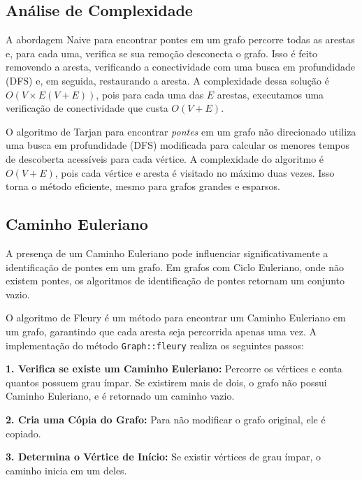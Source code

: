 \documentclass{article}
\begin{document}
\subsection{An\'alise de Complexidade}

A abordagem Naive para encontrar pontes em um grafo percorre todas as arestas e, para cada uma, verifica se sua remoção desconecta o grafo. Isso é feito removendo a aresta, verificando a conectividade com uma busca em profundidade (DFS) e, em seguida, restaurando a aresta.
A complexidade dessa solução é \( O(V \times E(V + E)) \), pois para cada uma das \( E \) arestas, executamos uma verificação de conectividade que custa \( O(V + E) \).

O algoritmo de Tarjan para encontrar \textit{pontes} em um grafo não direcionado utiliza uma busca em profundidade (DFS) modificada para calcular os menores tempos de descoberta acessíveis para cada vértice. A complexidade do algoritmo é \( O(V + E) \), pois cada vértice e aresta é visitado no máximo duas vezes. Isso torna o método eficiente, mesmo para grafos grandes e esparsos.

\subsection{Caminho Euleriano}

A presença de um Caminho Euleriano pode influenciar significativamente a identificação de pontes em um grafo. Em grafos com Ciclo Euleriano, onde não existem pontes, os algoritmos de identificação de pontes retornam um conjunto vazio.

O algoritmo de Fleury é um método para encontrar um Caminho Euleriano em um grafo, garantindo que cada aresta seja percorrida apenas uma vez. A implementação do método \texttt{Graph::fleury} realiza os seguintes passos:

\textbf{1. Verifica se existe um Caminho Euleriano:} Percorre os vértices e conta quantos possuem grau ímpar. Se existirem mais de dois, o grafo não possui Caminho Euleriano, e é retornado um caminho vazio.

\textbf{2. Cria uma Cópia do Grafo:} Para não modificar o grafo original, ele é copiado.

\textbf{3. Determina o Vértice de Início:} Se existir vértices de grau ímpar, o caminho inicia em um deles.
\end{document}
